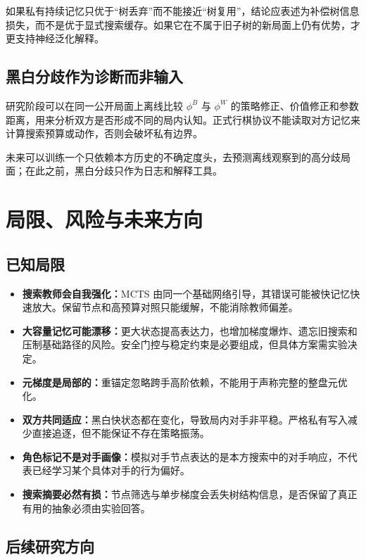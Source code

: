 \documentclass[UTF8,11pt,a4paper]{ctexart}
\begin{document}
如果私有持续记忆只优于“树丢弃”而不能接近“树复用”，结论应表述为补偿树信息损失，而不是优于显式搜索缓存。如果它在不属于旧子树的新局面上仍有优势，才更支持神经泛化解释。

\subsection{黑白分歧作为诊断而非输入}

研究阶段可以在同一公开局面上离线比较 $\phi^B$ 与 $\phi^W$ 的策略修正、价值修正和参数距离，用来分析双方是否形成不同的局内认知。正式行棋协议不能读取对方记忆来计算搜索预算或动作，否则会破坏私有边界。

未来可以训练一个只依赖本方历史的不确定度头，去预测离线观察到的高分歧局面；在此之前，黑白分歧只作为日志和解释工具。

\section{局限、风险与未来方向}

\subsection{已知局限}

\begin{itemize}
  \item \textbf{搜索教师会自我强化：}MCTS 由同一个基础网络引导，其错误可能被快记忆快速放大。保留节点和高预算对照只能缓解，不能消除教师偏差。
  \item \textbf{大容量记忆可能漂移：}更大状态提高表达力，也增加梯度爆炸、遗忘旧搜索和压制基础路径的风险。安全门控与稳定约束是必要组成，但具体方案需实验决定。
  \item \textbf{元梯度是局部的：}重锚定忽略跨手高阶依赖，不能用于声称完整的整盘元优化。
  \item \textbf{双方共同适应：}黑白快状态都在变化，导致局内对手非平稳。严格私有写入减少直接追逐，但不能保证不存在策略振荡。
  \item \textbf{角色标记不是对手画像：}模拟对手节点表达的是本方搜索中的对手响应，不代表已经学习某个具体对手的行为偏好。
  \item \textbf{搜索摘要必然有损：}节点筛选与单步梯度会丢失树结构信息，是否保留了真正有用的抽象必须由实验回答。
\end{itemize}

\subsection{后续研究方向}
\end{document}
